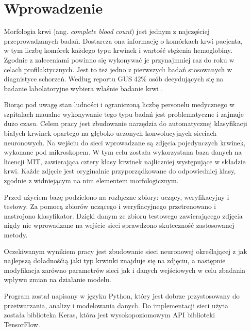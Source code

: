 \chapter{Wprowadzenie}
\label{cha:wprowadzenie}
Morfologia krwi (ang. \textit{complete blood count}) jest jednym z najczęściej przeprowadzanych badań. Dostarcza ona informację o komórkach krwi pacjenta, w tym liczbę komórek każdego typu krwinek i wartość stężenia hemoglobiny. Zgodnie z zaleceniami powinno się wykonywać je przynajmniej raz do roku w celach profilaktycznych. Jest to też jedno z pierwszych badań stosowanych w diagnistyce schorzeń. Według reportu GUS 42\% osób decydujących się na badanie labolatoryjne wybiera właśnie badanie krwi \cite{GUS_Zdrowie2016}.

\begin{center}
\end{center}


Biorąc pod uwagę stan ludności i ograniczoną liczbę personelu medycznego w szpitalach maualne wykonywanie tego typu badań jest problematyczne i zajmuje dużo czasu. Celem pracy jest zbudowanie narzędzia do automatycznej klasyfikacji białych krwinek opartego na głęboko uczonych konwolucyjnych sieciach neuronowych. Na wejściu do sieci wprowadzane są zdjęcia pojedynczych krwinek, wykonane pod mikroskopem. W tym celu została wykorzystana baza danych na licencji MIT, zawierająca cztery klasy krwinek najliczniej występujące w składzie krwi. Każde zdjęcie jest oryginalnie przyporządkowane do odpowiedniej klasy, zgodnie z widniejącym na nim elementem morfologicznym. 

Przed użyciem bazę podzielono na rozłączne zbiory: uczący, weryfikacyjny i testowy. Za pomocą zbiorów uczącego i weryfiacyjnego przetrenowano i nastrojono klasyfikator. Dzięki danym ze zbioru testowego zawierającego zdjęcia nigdy nie wprowadzane na wejście sieci sprawdzono skuteczność zastosowanej metody.

Oczekiwanym wynikiem pracy jest zbudowanie sieci neuronowej określającej z jak najlepszą doładnośćią jaki typ krwinki znajduje się na zdjęciu, a następnie modyfikacja zarówno parametrów sieci jak i danych wejściowych w celu zbadania wpływu zmian na działanie modelu.

Program został napisany w języku Python, który jest dobrze przystosowany do przetwarzania, analizy i modelowania danych. Do implementacji sieci użyta została biblioteka Keras, która jest wysokopoziomowym API biblioteki TensorFlow.

